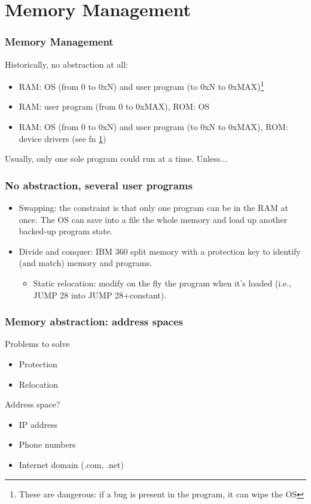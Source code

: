 \section{Memory Management}
  \begin{frame}
    \frametitle{Memory Management}
      Historically, no abstraction at all:
      \begin{itemize}
        \item RAM: OS (from 0 to 0xN) and user program (to 0xN to 0xMAX)\footnote{\label{fn:bug}These are dangerous: if a bug is present in the program, it can wipe the OS}
        \item RAM: user program (from 0 to 0xMAX), ROM: OS
        \item RAM: OS (from 0 to 0xN) and user program (to 0xN to 0xMAX), ROM: device drivers (see fn \ref{fn:bug})
      \end{itemize}
      Usually, only one sole program could run at a time. Unless...
  \end{frame}

  \begin{frame}
    \frametitle{No abstraction, several user programs}
    \begin{itemize}
      \item Swapping: the constraint is that only one program can be in the RAM at once. The OS can save into a file the whole memory and load up another backed-up program state.
      \item Divide and conquer: IBM 360 split memory with a protection key to identify (and match) memory and programs.
      \begin{itemize}
        \item Static relocation: modify on the fly the program when it's loaded (i.e., JUMP 28 into JUMP 28+constant).
      \end{itemize}
    \end{itemize}
  \end{frame}

  \begin{frame}
    \frametitle{Memory abstraction: address spaces}
    \begin{block}{Problems to solve}
      \begin{itemize}
        \item Protection
        \item Relocation
      \end{itemize}
    \end{block}
    \begin{block}{Address space?}
      \begin{itemize}
        \item IP address
        \item Phone numbers
        \item Internet domain (.com, .net)
      \end{itemize}
    \end{block}
  \end{frame}

